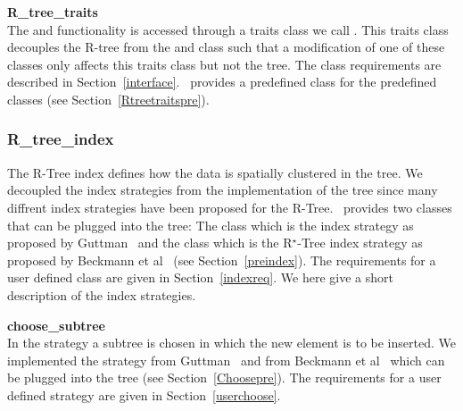 \noindent
{\bf R\_tree\_traits}\\
\noindent
The 
and  functionality is
accessed through a traits class we call . This traits class decouples
the R-tree  from the 
and  class such that a modification of one of these classes
only affects this traits class but not the tree. 
The  class requirements are
described in  Section~\ref{interface}.
\cgal\ provides a predefined  class for the
predefined  classes (see Section~\ref{Rtreetraitspre}). 




\subsubsection{R\_tree\_index}
The R-Tree index defines how the data is spatially clustered in
the tree. We decoupled the index strategies from the
implementation of the tree since many diffrent index
strategies have been proposed for the R-Tree. \cgal\ provides two 
 classes that can be plugged into the tree: The
 class which is the index strategy as
proposed by Guttman~\cite{g-rtdis-84} and the 
class which is the R$^\star$-Tree index strategy as proposed by  Beckmann
et al~\cite{bkss-rtera-90} (see Section~\ref{preindex}). The
requirements for a user defined  class are
given in Section~\ref{indexreq}.
We here give a
short description of the index strategies.
\medskip

\noindent
{\bf choose\_subtree}\\
\noindent
In the  strategy a subtree is chosen in which 
the new element is to be inserted. 
We implemented
the  strategy from Guttman~\cite{g-rtdis-84}
and from Beckmann
et al~\cite{bkss-rtera-90} which can be plugged into the
tree (see Section~\ref{Choosepre}). The requirements for a user
defined  strategy are given in
Section~\ref{userchoose}.
\medskip

